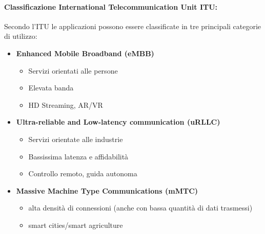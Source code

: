 \paragraph{Classificazione International Telecommunication Unit ITU:} Secondo l'ITU le applicazioni possono essere classificate in tre principali categorie di utilizzo:
\begin{itemize}
	\item \textbf{Enhanced Mobile Broadband (eMBB)}
	\begin{itemize}
		\item Servizi orientati alle persone
		\item Elevata banda
		\item HD Streaming, AR/VR
	\end{itemize}
	\item \textbf{Ultra-reliable and Low-latency communication (uRLLC)}
	\begin{itemize}
		\item Servizi orientate alle industrie
		\item Bassissima latenza e affidabilità
		\item Controllo remoto, guida autonoma
	\end{itemize}
	\item \textbf{Massive Machine Type Communications (mMTC)}
	\begin{itemize}
		\item alta densità di connessioni (anche con bassa quantità di dati trasmessi)
		\item smart cities/smart agriculture
	\end{itemize}
\end{itemize}

